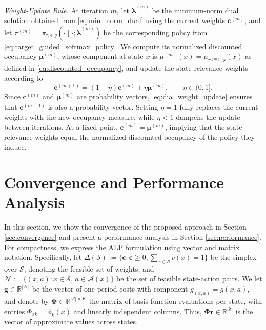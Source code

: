 \documentclass[sglanonrev]{informs4}
\providecommand{\bPhi}{\boldsymbol{\Phi}}
\providecommand{\bc}{\boldsymbol{c}}
\providecommand{\bg}{\boldsymbol{g}}
\providecommand{\blambda}{\boldsymbol{\lambda}}
\providecommand{\bmu}{\boldsymbol{\mu}}
\providecommand{\bnu}{\boldsymbol{\nu}}
\providecommand{\br}{\boldsymbol{r}}
\def\edits#1{{\color{black}#1}}
\begin{document}
\smallskip
\noindent 
\textit{Weight-Update Rule.}
At iteration $m$, let $\overline{\blambda}^{(m)}$ be the minimum-norm dual solution obtained from \eqref{eq:min_norm_dual} using the current
weights $\bc^{(m)}$, and let $\pi^{(m)}=\pi_{\tau,\epsilon,q}(\cdot\mid\cdot; \overline{\blambda}^{(m)})$ be the corresponding policy from \eqref{eq:target_guided_softmax_policy}. We compute its normalized discounted occupancy $\bmu^{(m)}$, whose component at state $x$ is
$\mu^{(m)}(x)=\mu_{\pi^{(m)},\bnu}(x)$ as defined in \eqref{eq:discounted_occupancy}, and update the state-relevance weights
according to
\begin{equation}
\label{eq:dia_weight_update}
\bc^{(m+1)}
=
(1-\eta)\bc^{(m)}+\eta\bmu^{(m)},
\qquad \eta\in(0,1].
\end{equation}
\edits{Since $\bc^{(m)}$ and $\bmu^{(m)}$ are probability vectors,
\eqref{eq:dia_weight_update} ensures that $\bc^{(m+1)}$ is also a probability vector. Setting $\eta=1$ fully replaces the current weights with the new occupancy measure, while $\eta<1$ dampens the update between iterations. At a fixed point, $\bc^{(m)}=\bmu^{(m)}$, implying that the state-relevance weights equal the normalized discounted occupancy of the policy they induce.}

\section{Convergence and Performance Analysis}
\label{sec:convergence_performance_analysis}

In this section, we show the convergence of the proposed approach in Section \ref{sec:convergence} and present a performance analysis in Section \ref{sec:performance}. \edits{For compactness, we express the \ac{ALP} formulation using vector and matrix notation.} Specifically, let $\Delta(\mathcal S) := \{ \bc \colon \bc \ge 0, \sum_{x \in \mathcal S} c(x) = 1 \}$ be the simplex over $\mathcal S$, denoting the feasible set of weights, and $\mathcal N := \{(x, a) \colon x \in \mathcal S, \, a \in \mathcal A(x)\}$ be the set of feasible state-action pairs.  We let $\bg\in\mathbb R^{|\mathcal N|}$ be the vector of one-period costs with component $g_{(x,a)}=g(x,a)$, and denote by $\bPhi\in\mathbb R^{|\mathcal S|\times K}$ the matrix of basis function evaluations per state, with entries $\Phi_{xk}=\phi_k(x)$ and linearly independent columns. Thus, $\bPhi\br\in\mathbb R^{|\mathcal S|}$ is the vector of approximate values across states. 
\end{document}
